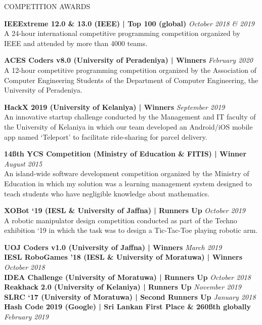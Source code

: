 \documentclass{cv}
\begin{document}
\begin{rSection}{COMPETITION AWARDS}{
    {\bf IEEExtreme 12.0 \& 13.0 (IEEE) | Top 100 (global)}                         \hfill {\em October 2018 \& 2019}
    \\A 24-hour international competitive programming competition organized by IEEE and attended by more than 4000 teams. \par

    {\bf ACES Coders v8.0 (University of Peradeniya) | Winners}                     \hfill {\em February 2020}
    \\A 12-hour competitive programming competition organized by the Association of Computer Engineering Students of the Department of Computer Engineering, the University of Peradeniya.\par

    {\bf HackX 2019 (University of Kelaniya) | Winners}                             \hfill {\em September 2019}
    \\An innovative startup challenge conducted by the Management and IT faculty of the University of Kelaniya in which our team developed an Android/iOS mobile app named `Teleport' to facilitate ride-sharing for parcel delivery.\par

    {\bf 14\ss{th} YCS Competition (Ministry of Education \& FITIS) | Winner}       \hfill {\em August 2015}
    \\An island-wide software development competition organized by the Ministry of Education in which my solution was a learning management system designed to teach students who have negligible knowledge about mathematics.\par

    {\bf XOBot `19 (IESL \& University of Jaffna) | Runners Up}                     \hfill {\em October 2019}
    \\A robotic manipulator design competition conducted as part of the Techno exhibition `19 in which the task was to design a Tic-Tac-Toe playing robotic arm.\par

    {\bf UOJ Coders v1.0 (University of Jaffna) | Winners}                          \hfill {\em March 2019} \\
    {\bf IESL RoboGames '18 (IESL \& University of Moratuwa) | Winners}             \hfill {\em October 2018} \\
    {\bf IDEA Challenge (University of Moratuwa) | Runners Up}                      \hfill {\em October 2018} \\
    {\bf Reakhack 2.0 (University of Kelaniya) | Runners Up}                        \hfill {\em November 2019} \\
    {\bf SLRC `17 (University of Moratuwa) | Second Runners Up}                     \hfill {\em January 2018} \\
    {\bf Hash Code 2019 (Google) | Sri Lankan First Place \& 260\ss{th} globally}   \hfill {\em February 2019} \par

    }\end{rSection}
\end{document}
